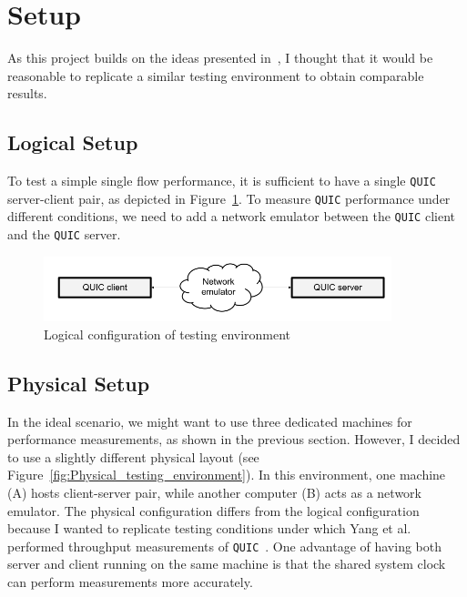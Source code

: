 \documentclass[12pt,a4paper,twoside,openright]{report}
\begin{document}




\section{Setup}

As this project builds on the ideas presented in~\cite{Making_QUIC_Quicker}, I thought that it would be reasonable to replicate a similar testing environment to obtain comparable results.

\subsection{Logical Setup}
To test a simple single flow performance, it is sufficient to have a single \texttt{QUIC} server-client pair, as depicted in Figure~\ref{fig:Logical_testing_environment}.
To measure \texttt{QUIC} performance under different conditions, we need to add a network emulator between the \texttt{QUIC} client and the \texttt{QUIC} server.

    \begin{figure}[ht]
    \centering
    \includegraphics[width=0.9\textwidth]{figs/Logical_testing_environment.png}
    \caption{Logical configuration of testing environment}
    \label{fig:Logical_testing_environment}
    \end{figure}

\subsection{Physical Setup} \label{physical_setup_subsection}
    In the ideal scenario, we might want to use three dedicated machines for performance measurements, as shown in the previous section.
    However, I decided to use a slightly different physical layout (see Figure~\ref{fig:Physical_testing_environment}).
    In this environment, one machine (A) hosts client-server pair, while another computer (B) acts as a network emulator.
    The physical configuration differs from the logical configuration because I wanted to replicate testing conditions under which Yang et al. performed throughput measurements of \texttt{QUIC}~\cite{Making_QUIC_Quicker}.
    One advantage of having both server and client running on the same machine is that the shared system clock can perform measurements more accurately. 
    
\end{document}

